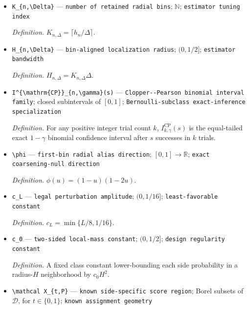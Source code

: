 \documentclass{article}
\begin{document}
\begin{itemize}
  \item \texttt{K\_\allowbreak{}\{n,\allowbreak{}\textbackslash{}\allowbreak{}Delta\}\allowbreak{}} --- \texttt{number of retained radial bins}; \(\mathbb N\); \texttt{estimator tuning index}
  \par\smallskip\noindent\emph{Definition.} \(K_{n,\Delta}=\lceil h_n/\Delta\rceil\).
  \item \texttt{H\_\allowbreak{}\{n,\allowbreak{}\textbackslash{}\allowbreak{}Delta\}\allowbreak{}} --- \texttt{bin-\allowbreak{}aligned localization radius}; \((0,1/2]\); \texttt{estimator bandwidth}
  \par\smallskip\noindent\emph{Definition.} \(H_{n,\Delta}=K_{n,\Delta}\Delta\).
  \item \texttt{I\textasciicircum{}\{\textbackslash{}\allowbreak{}mathrm\{CP\}\allowbreak{}\}\allowbreak{}\_\allowbreak{}\{n,\allowbreak{}\textbackslash{}\allowbreak{}gamma\}\allowbreak{}(s)} --- \texttt{Clopper-\allowbreak{}-\allowbreak{}Pearson binomial interval family}; closed subintervals of \([0,1]\); \texttt{Bernoulli-\allowbreak{}subclass exact-\allowbreak{}inference specialization}
  \par\smallskip\noindent\emph{Definition.} For any positive integer trial count \(k\), \(I^{\mathrm{CP}}_{k,\gamma}(s)\) is the equal-tailed exact \(1-\gamma\) binomial confidence interval after \(s\) successes in \(k\) trials.
  \item \texttt{\textbackslash{}\allowbreak{}phi} --- \texttt{first-\allowbreak{}bin radial alias direction}; \([0,1]\to\mathbb R\); \texttt{exact coarsening-\allowbreak{}null direction}
  \par\smallskip\noindent\emph{Definition.} \(\phi(u)=(1-u)(1-2u)\).
  \item \texttt{c\_\allowbreak{}L} --- \texttt{legal perturbation amplitude}; \((0,1/16]\); \texttt{least-\allowbreak{}favorable constant}
  \par\smallskip\noindent\emph{Definition.} \(c_L=\min\{L/8,1/16\}\).
  \item \texttt{c\_\allowbreak{}0} --- \texttt{two-\allowbreak{}sided local-\allowbreak{}mass constant}; \((0,1/2]\); \texttt{design regularity constant}
  \par\smallskip\noindent\emph{Definition.} A fixed class constant lower-bounding each side probability in a radius-\(H\) neighborhood by \(c_0H^2\).
  \item \texttt{\textbackslash{}\allowbreak{}mathcal X\_\allowbreak{}\{t,\allowbreak{}P\}\allowbreak{}} --- \texttt{known side-\allowbreak{}specific score region}; Borel subsets of \(\mathcal D\), for \(t\in\{0,1\}\); \texttt{known assignment geometry}

\end{itemize}
\end{document}
